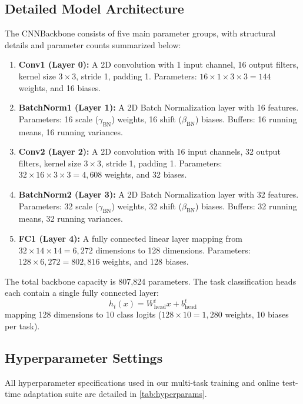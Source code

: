 \documentclass{article}
\begin{document}
\subsection{Detailed Model Architecture}
The CNNBackbone consists of five main parameter groups, with structural details and parameter counts summarized below:
\begin{enumerate}
    \item \textbf{Conv1 (Layer 0):} A 2D convolution with 1 input channel, 16 output filters, kernel size $3 \times 3$, stride 1, padding 1. Parameters: $16 \times 1 \times 3 \times 3 = 144$ weights, and 16 biases.
    \item \textbf{BatchNorm1 (Layer 1):} A 2D Batch Normalization layer with 16 features. Parameters: 16 scale ($\gamma_{\text{BN}}$) weights, 16 shift ($\beta_{\text{BN}}$) biases. Buffers: 16 running means, 16 running variances.
    \item \textbf{Conv2 (Layer 2):} A 2D convolution with 16 input channels, 32 output filters, kernel size $3 \times 3$, stride 1, padding 1. Parameters: $32 \times 16 \times 3 \times 3 = 4,608$ weights, and 32 biases.
    \item \textbf{BatchNorm2 (Layer 3):} A 2D Batch Normalization layer with 32 features. Parameters: 32 scale ($\gamma_{\text{BN}}$) weights, 32 shift ($\beta_{\text{BN}}$) biases. Buffers: 32 running means, 32 running variances.
    \item \textbf{FC1 (Layer 4):} A fully connected linear layer mapping from $32 \times 14 \times 14 = 6,272$ dimensions to 128 dimensions. Parameters: $128 \times 6,272 = 802,816$ weights, and 128 biases.
\end{enumerate}
The total backbone capacity is 807,824 parameters. The task classification heads each contain a single fully connected layer:
\begin{equation}
    h_t(x) = W_{\text{head}}^t x + b_{\text{head}}^t
\end{equation}
mapping 128 dimensions to 10 class logits ($128 \times 10 = 1,280$ weights, 10 biases per task).

\subsection{Hyperparameter Settings}
All hyperparameter specifications used in our multi-task training and online test-time adaptation suite are detailed in \cref{tab:hyperparams}.
\end{document}
